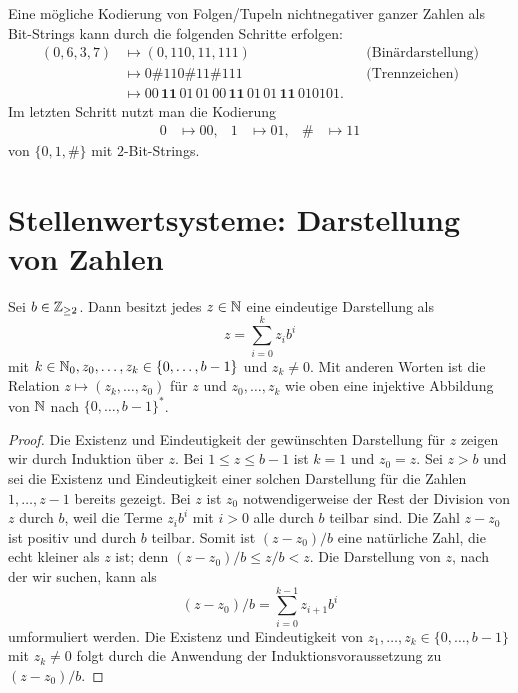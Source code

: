\begin{bsp}
	Eine mögliche Kodierung von Folgen/Tupeln nichtnegativer ganzer Zahlen als Bit-Strings kann durch die folgenden Schritte erfolgen: 
	\begin{align*}
		(0, 6,3,7) & \mapsto (0,110,11,111)  & & \text{(Binärdarstellung)} 
		\\ & \mapsto 0 \mathbf{\#} 110 \mathbf{\#} 11 \mathbf{\#} 111 & & \text{(Trennzeichen)} 		
		\\ & \mapsto  00 \, \mathbf{11} \,  01 \,  01 \, 00 \, \mathbf{11 }\, 01 \, 01 \, \mathbf{11} \, 01 01 01.
	\end{align*}
	Im letzten Schritt nutzt man die Kodierung 
	\begin{align*}
		0 & \mapsto 00, & 1& \mapsto 01, &  \# & \mapsto 11
	\end{align*}
	von $\{0,1,\#\}$ mit $2$-Bit-Strings. 
\end{bsp} 


\section{Stellenwertsysteme: Darstellung von Zahlen}

\begin{thm} \label{thm:stellenwert}
	Sei $b \in \mathbb{Z}_{\ge 2}$. Dann besitzt jedes $z \in \mathbb{N}$ eine eindeutige Darstellung als 
	\begin{equation}\label{z:zur:Basis:b}
		z = \sum_{i=0}^k z_i b^i
	\end{equation}
	mit $k \in \mathbb{N}_0, z_0,\ldots,z_k \in \{0,\ldots,b-1\}$ und $z_k \ne 0$. Mit anderen Worten ist die Relation $z \mapsto (z_k,\ldots,z_0)$ für $z$ und $z_0,\ldots,z_k$ wie oben eine injektive Abbildung von $\mathbb{N}$ nach $\{0,\ldots,b-1\}^\ast$.
\end{thm}
\begin{proof}
 	Die Existenz und Eindeutigkeit der gewünschten Darstellung für $z$ zeigen wir durch Induktion über $z$. Bei $1 \le z \le b-1$ ist $k=1$ und $z_0=z$. Sei $z>b$ und sei die Existenz und Eindeutigkeit einer solchen Darstellung für die Zahlen $1,\ldots,z-1$ bereits gezeigt. Bei $z$ ist $z_0$ notwendigerweise der Rest der Division von $z$ durch $b$, weil die Terme $z_i b^i$ mit $i>0$ alle durch $b$ teilbar sind. Die Zahl $z-z_0$ ist positiv und durch $b$ teilbar. Somit ist $(z-z_0) / b$ eine natürliche Zahl, die echt kleiner als $z$ ist; denn $(z-z_0)/b \le z / b < z$. Die Darstellung von $z$, nach der wir suchen, kann als 
 	\[
 		(z-z_0)/b = \sum_{i=0}^{k-1} z_{i+1} b^i
 	\]
 	umformuliert werden. Die Existenz und Eindeutigkeit von $z_1,\ldots,z_k \in \{0,\ldots,b-1\}$ mit $z_k \ne 0$ folgt durch die Anwendung der Induktionsvoraussetzung zu $(z-z_0)/b$. 
\end{proof} 


